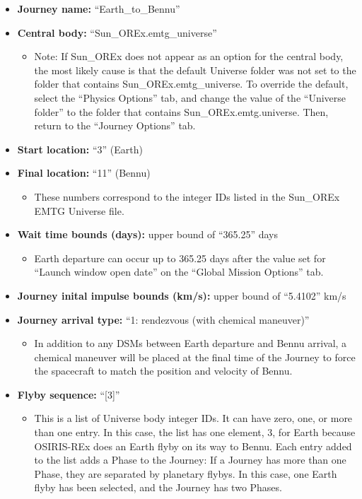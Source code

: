 \documentclass[11pt]{article}
\begin{document}
\begin{itemize}
	\item \textbf{Journey name:} ``Earth\_to\_Bennu''
	\item \textbf{Central body:} ``Sun\_OREx.emtg\_universe''
	\begin{itemize}
		\item  Note: If Sun\_OREx does not appear as an option for the central body, the most likely cause is that the default Universe folder was not set to the folder that contains Sun\_OREx.emtg\_universe. To override the default, select the ``Physics Options'' tab, and change the value of the ``Universe folder'' to the folder that contains Sun\_OREx.emtg.universe. Then, return to the ``Journey Options'' tab.
	\end{itemize}
	\item \textbf{Start location:} ``3'' (Earth)
	\item \textbf{Final location:} ``11'' (Bennu)
	\begin{itemize}
		\item These numbers correspond to the integer IDs listed in the Sun\_OREx EMTG Universe file.
	\end{itemize}
	\item \textbf{Wait time bounds (days):} upper bound of ``365.25'' days
	\begin{itemize}
		\item Earth departure can occur up to 365.25 days after the value set for ``Launch window open date'' on the ``Global Mission Options'' tab.
	\end{itemize}
	\item \textbf{Journey inital impulse bounds (km/s):} upper bound of ``5.4102'' km/s
	\item \textbf{Journey arrival type:} ``1: rendezvous (with chemical maneuver)''
	\begin{itemize}
		\item In addition to any DSMs between Earth departure and Bennu arrival, a chemical maneuver will be placed at the final time of the Journey to force the spacecraft to match the position and velocity of Bennu.
	\end{itemize}
	\item \textbf{Flyby sequence:} ``[3]''
	\begin{itemize}
		\item This is a list of Universe body integer IDs. It can have zero, one, or more than one entry. In this case, the list has one element, 3, for Earth because OSIRIS-REx does an Earth flyby on its way to Bennu. Each entry added to the list adds a Phase to the Journey: If a Journey has more than one Phase, they are separated by planetary flybys. In this case, one Earth flyby has been selected, and the Journey has two Phases.
	\end{itemize}
\end{itemize}
\end{document}
